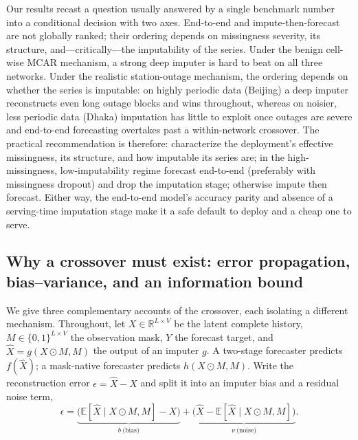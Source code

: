 \documentclass[review,3p,times]{elsarticle}
\begin{document}
Our results recast a question usually answered by a single benchmark number into
a conditional decision with two axes. End-to-end and impute-then-forecast are not
globally ranked; their ordering depends on missingness severity, its structure,
and---critically---the imputability of the series. Under the benign cell-wise
MCAR mechanism, a strong deep imputer is hard to beat on all three networks. Under the
realistic station-outage mechanism, the ordering depends on whether the series is
imputable: on highly periodic data (Beijing) a deep imputer reconstructs even
long outage blocks and wins throughout, whereas on noisier, less periodic data
(Dhaka) imputation has little to exploit once outages are severe and end-to-end
forecasting overtakes past a within-network crossover. The practical
recommendation is therefore: characterize the deployment's effective missingness,
its structure, and how imputable its series are; in the high-missingness,
low-imputability regime forecast end-to-end (preferably with missingness dropout)
and drop the imputation stage; otherwise impute then forecast. Either way, the
end-to-end model's accuracy parity and absence of a serving-time imputation stage
make it a safe default to deploy and a cheap one to serve.

\subsection{Why a crossover must exist: error propagation, bias--variance, and
an information bound}
\label{sec:theory}

We give three complementary accounts of the crossover, each isolating a
different mechanism. Throughout, let $X\in\mathbb{R}^{L\times V}$ be the latent
complete history, $M\in\{0,1\}^{L\times V}$ the observation mask, $Y$ the
forecast target, and $\hat{X}=g(X\odot M,M)$ the output of an imputer $g$. A
two-stage forecaster predicts $f(\hat{X})$; a mask-native forecaster predicts
$h(X\odot M,M)$. Write the reconstruction error $\epsilon=\hat{X}-X$ and split it
into an imputer bias and a residual noise term,
\[
\epsilon =
\underbrace{\big(\mathbb{E}[\hat{X}\mid X\odot M,M]-X\big)}_{b\ \text{(bias)}}
+ \underbrace{\big(\hat{X}-\mathbb{E}[\hat{X}\mid X\odot M,M]\big)}_{\nu\ \text{(noise)}}.
\]
\end{document}
